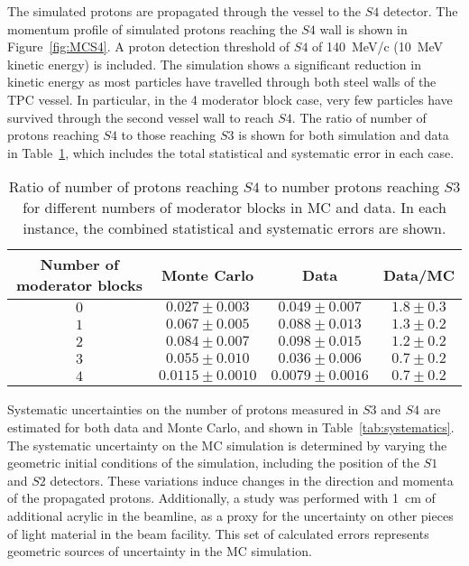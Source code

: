 The simulated protons are propagated through the vessel to the $\mathit{S4}$ detector.
The momentum profile of simulated protons reaching the $\mathit{S4}$ wall is shown in Figure~\ref{fig:MCS4}.
A proton detection threshold of $\mathit{S4}$ of 140~MeV/c (10~MeV kinetic energy) is included.
The simulation shows a significant reduction in kinetic energy as most particles have travelled through both steel walls of the TPC vessel.
In particular, in the 4 moderator block case, very few particles have survived through the second vessel wall to reach $\mathit{S4}$.
The ratio of number of protons reaching $\mathit{S4}$ to those reaching $\mathit{S3}$ is shown for both simulation and data in Table~\ref{tab:ratios}, which includes the total statistical and systematic error in each case.

\begin{table}
	\centering
	\caption{Ratio of number of protons reaching $\mathit{S4}$ to number protons reaching $\mathit{S3}$ for different numbers of moderator blocks in MC and data. In each instance, the combined statistical and systematic errors are shown.}
	\begin{tabular}{|c|c|c|c|}
		\hline 
		Number of moderator blocks & Monte Carlo & Data & Data/MC\\
		\hline
		$0$ & $0.027 \pm 0.003$ & $0.049 \pm 0.007$ & $1.8 \pm 0.3$ \\
		$1$ & $0.067 \pm 0.005$ & $0.088 \pm 0.013$ & $1.3 \pm 0.2$ \\
		$2$ & $0.084 \pm 0.007$ & $0.098 \pm 0.015$ & $1.2 \pm 0.2$ \\
		$3$ & $0.055 \pm 0.010$ & $0.036 \pm 0.006$ & $0.7 \pm 0.2$ \\
		$4$ & $0.0115 \pm 0.0010$ & $0.0079 \pm 0.0016$ & $0.7 \pm 0.2$ \\
		\hline
	\end{tabular}
	\label{tab:ratios}
\end{table}

Systematic uncertainties on the number of protons measured in $\mathit{S3}$ and $\mathit{S4}$ are estimated for both data and Monte Carlo, and shown in Table~\ref{tab:systematics}.
The systematic uncertainty on the MC simulation is determined by varying the geometric initial conditions of the simulation, including the position of the $\mathit{S1}$ and $\mathit{S2}$ detectors.
These variations induce changes in the direction and momenta of the propagated protons.
Additionally, a study was performed with 1~cm of additional acrylic in the beamline, as a proxy for the uncertainty on other pieces of light material in the beam facility.
This set of calculated errors represents geometric sources of uncertainty in the MC simulation.

